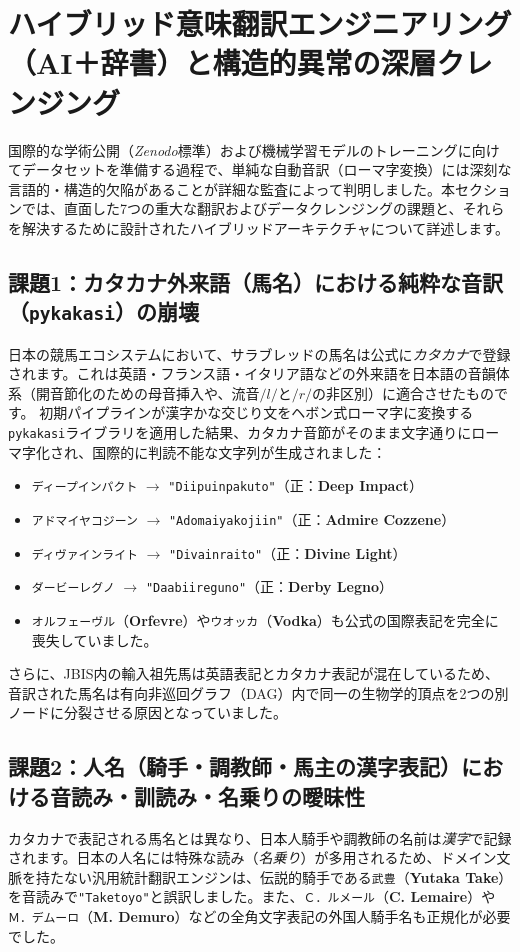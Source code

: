 \documentclass[12pt,a4paper]{article}
\begin{document}
\section{ハイブリッド意味翻訳エンジニアリング（AI＋辞書）と構造的異常の深層クレンジング}

国際的な学術公開（\textit{Zenodo}標準）および機械学習モデルのトレーニングに向けてデータセットを準備する過程で、単純な自動音訳（ローマ字変換）には深刻な言語的・構造的欠陥があることが詳細な監査によって判明しました。本セクションでは、直面した7つの重大な翻訳およびデータクレンジングの課題と、それらを解決するために設計されたハイブリッドアーキテクチャについて詳述します。

\subsection{課題1：カタカナ外来語（馬名）における純粋な音訳（\texttt{pykakasi}）の崩壊}
日本の競馬エコシステムにおいて、サラブレッドの馬名は公式に\textit{カタカナ}で登録されます。これは英語・フランス語・イタリア語などの外来語を日本語の音韻体系（開音節化のための母音挿入や、流音$/l/$と$/r/$の非区別）に適合させたものです。
初期パイプラインが漢字かな交じり文をヘボン式ローマ字に変換する\texttt{pykakasi}ライブラリを適用した結果、カタカナ音節がそのまま文字通りにローマ字化され、国際的に判読不能な文字列が生成されました：
\begin{itemize}
    \item \texttt{ディープインパクト} $\to$ \texttt{"Diipuinpakuto"}（正：\textbf{Deep Impact}）
    \item \texttt{アドマイヤコジーン} $\to$ \texttt{"Adomaiyakojiin"}（正：\textbf{Admire Cozzene}）
    \item \texttt{ディヴァインライト} $\to$ \texttt{"Divainraito"}（正：\textbf{Divine Light}）
    \item \texttt{ダービーレグノ} $\to$ \texttt{"Daabiireguno"}（正：\textbf{Derby Legno}）
    \item \texttt{オルフェーヴル}（\textbf{Orfevre}）や\texttt{ウオッカ}（\textbf{Vodka}）も公式の国際表記を完全に喪失していました。
\end{itemize}
さらに、JBIS内の輸入祖先馬は英語表記とカタカナ表記が混在しているため、音訳された馬名は有向非巡回グラフ（DAG）内で同一の生物学的頂点を2つの別ノードに分裂させる原因となっていました。

\subsection{課題2：人名（騎手・調教師・馬主の漢字表記）における音読み・訓読み・名乗りの曖昧性}
カタカナで表記される馬名とは異なり、日本人騎手や調教師の名前は\textit{漢字}で記録されます。日本の人名には特殊な読み（\textit{名乗り}）が多用されるため、ドメイン文脈を持たない汎用統計翻訳エンジンは、伝説的騎手である\texttt{武豊}（\textbf{Yutaka Take}）を音読みで\texttt{"Taketoyo"}と誤訳しました。また、\texttt{Ｃ．ルメール}（\textbf{C. Lemaire}）や\texttt{Ｍ．デムーロ}（\textbf{M. Demuro}）などの全角文字表記の外国人騎手名も正規化が必要でした。
\end{document}

